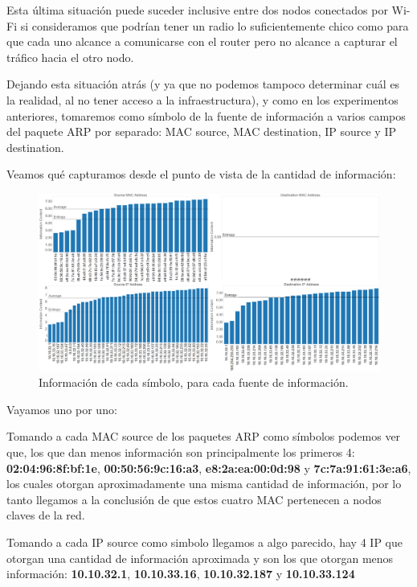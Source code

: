 \documentclass{article}
\theoremstyle{definition}
\theoremstyle{remark}
\begin{document}
Esta última situación puede suceder inclusive entre dos nodos conectados por Wi-Fi si consideramos que podrían tener un radio lo suficientemente chico como para que cada uno alcance a comunicarse con el router pero no alcance a capturar el tráfico hacia el otro nodo.\vspace{1mm}

Dejando esta situación atrás (y ya que no podemos tampoco determinar cuál es la realidad, al no tener acceso a la infraestructura), y como en los experimentos anteriores, tomaremos como símbolo de la fuente de información a varios campos del paquete ARP por separado: MAC source, MAC destination, IP source y IP destination.

\par Veamos qué capturamos desde el punto de vista de la cantidad de información:

\begin{figure}[H]
\centering
\includegraphics[width=420pt]{captures/MercadoLibre/PDFs Dashboard.png}
\caption{Información de cada símbolo, para cada fuente de información.}
\end{figure}

Vayamos uno por uno:\vspace{2mm}

Tomando a cada MAC source de los paquetes ARP como símbolos podemos ver que, los que dan menos información son principalmente los primeros 4: \textbf{02:04:96:8f:bf:1e}, \textbf{00:50:56:9c:16:a3}, \textbf{e8:2a:ea:00:0d:98} y \textbf{7c:7a:91:61:3e:a6},  los cuales otorgan aproximadamente una misma cantidad de información, por lo tanto llegamos a la conclusión de que estos cuatro MAC pertenecen a nodos claves de la red.\vspace{1mm}

Tomando a cada IP source como simbolo llegamos a algo parecido, hay 4 IP que otorgan una cantidad de información aproximada y son los que otorgan menos información: \textbf{10.10.32.1}, \textbf{10.10.33.16}, \textbf{10.10.32.187} y \textbf{10.10.33.124}
\end{document}
